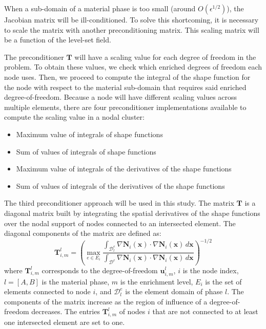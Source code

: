 When a sub-domain of a material phase is too small (around $O(\epsilon^{1/2})$), the Jacobian matrix will be ill-conditioned. To solve this shortcoming, it is necessary to scale the matrix with another preconditioning matrix. This scaling matrix will be a function of the level-set field.

The preconditioner $\pmb{T}$ will have a scaling value for each degree of freedom in the problem. To obtain these values, we check which enriched degrees of freedom each node uses. Then, we proceed to compute the integral of the shape function for the node with respect to the material sub-domain that requires said enriched degree-of-freedom. Because a node will have different scaling values across multiple elements, there are four preconditioner implementations available to compute the scaling value in a nodal cluster:

\begin{itemize}
\item Maximum value of integrals of shape functions
\item Sum of values of integrals of shape functions
\item Maximum value of integrals of the derivatives of the shape functions
\item Sum of values of integrals of the derivatives of the shape functions
\end{itemize}

The third preconditioner approach will be used in this study. The matrix $\pmb{T}$ is a diagonal matrix built by integrating the spatial derivatives of the shape functions over the nodal support of nodes connected to an intersected element. The diagonal components of the matrix are defined as:
%
\begin{equation}
	\pmb{T}_{i,m}^{l} = \left( \max_{e \in E_{i}} \frac { \int_{\mathcal{D}_l^e} \nabla \mathbf{N}_i(\mathbf{x}) \cdot
	\nabla
	\mathbf{N}_i(\mathbf{x}) \,d\mathbf{x}}{\int_{\mathcal{D}^e} \nabla \mathbf{N}_i(\mathbf{x}) \cdot \nabla
	\mathbf{N}_i(\mathbf{x}) \,d\mathbf{x}} \right)^{-1/2}
\end{equation}
%
where $\pmb{T}_{i,m}^{l}$ corresponds to the degree-of-freedom $\mathbf{u}_{i,m}^{l}$, $i$ is the node index, $l=[A,B]$ is the material phase, $m$ is the enrichment level, $E_{i}$ is the set of elements connected to node $i$, and $\mathcal{D}_l^e$ is the element domain of phase $l$. The components of the matrix increase as the region of influence of a degree-of-freedom decreases. The entries $\pmb{T}_{i,m}^{l}$ of nodes $i$ that are not connected to at least one intersected element are set to one.

